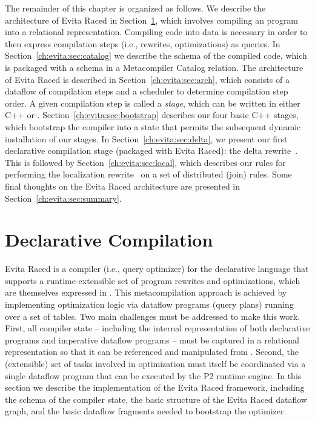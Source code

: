 The remainder of this chapter is organized as follows.  We describe the
architecture of Evita Raced in Section~\ref{ch:evita:sec:compile}, which
involves compiling an \OVERLOG program into a relational representation.
Compiling code into data is necessary in order to then express compilation
steps (i.e., rewrites, optimizations) as queries.  In
Section~\ref{ch:evita:sec:catalog} we describe the schema of the compiled code,
which is packaged with a schema in a Metacompiler Catalog relation.  The
architecture of Evita Raced is described in Section~\ref{ch:evita:sec:arch},
which consists of a dataflow of compilation steps and a scheduler to determine
compilation step order.  A given compilation step is called a {\em stage},
which can be written in either C++ or \OVERLOG.
Section~\ref{ch:evita:sec:bootstrap} describes our four basic C++ stages,
which bootstrap the compiler into a state that permits the subsequent dynamic
installation of our \OVERLOG stages.  In Section~\ref{ch:evita:sec:delta}, we
present our first declarative compilation stage (packaged with Evita Raced):
the delta rewrite~\cite{loo-sigmod06}.  This is followed by
Section~\ref{ch:evita:sec:local}, which describes our \OVERLOG rules for
performing the localization rewrite~\cite{p2:sosp} on a set of distributed
(join) rules.  Some final thoughts on the Evita Raced architecture are
presented in Section~\ref{ch:evita:sec:summary}.

\section{Declarative Compilation}
\label{ch:evita:sec:compile}

Evita Raced is a compiler (i.e., query optimizer) for the \OVERLOG declarative
language that supports a runtime-extensible set of program rewrites and
optimizations, which are themselves expressed in \OVERLOG.  This
metacompilation approach is achieved by implementing optimization logic via
dataflow programs (query plans) running over a set of tables.  Two main
challenges must be addressed to make this work.  First, all compiler state --
including the internal representation of both declarative \OVERLOG programs and
imperative dataflow programs -- must be captured in a relational representation
so that it can be referenced and manipulated from \OVERLOG.  Second, the
(extensible) set of tasks involved in optimization must itself be coordinated
via a single dataflow program that can be executed by the P2 runtime engine.
In this section we describe the implementation of the Evita Raced framework,
including the schema of the compiler state, the basic structure of the Evita
Raced dataflow graph, and the basic dataflow fragments needed to bootstrap the
optimizer.

